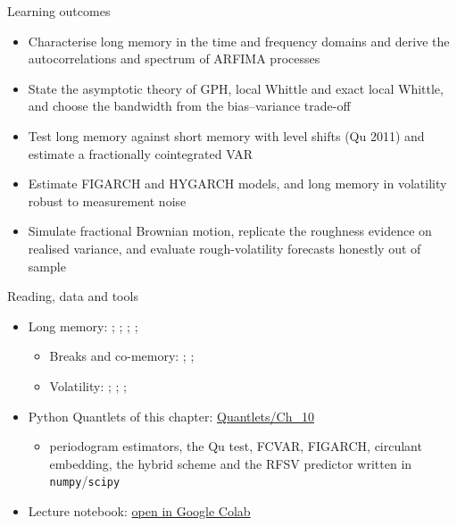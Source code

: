 \begin{frame}{Learning outcomes}
\itemsize{\small}
\begin{itemize}
    \item Characterise long memory in the time and frequency domains and derive the autocorrelations and spectrum of ARFIMA processes
    \item State the asymptotic theory of GPH, local Whittle and exact local Whittle, and choose the bandwidth from the bias--variance trade-off
    \item Test long memory against short memory with level shifts (Qu 2011) and estimate a fractionally cointegrated VAR
    \item Estimate FIGARCH and HYGARCH models, and long memory in volatility robust to measurement noise
    \item Simulate fractional Brownian motion, replicate the roughness evidence on realised variance, and evaluate rough-volatility forecasts honestly out of sample
\end{itemize}
\end{frame}

\begin{frame}{Reading, data and tools}
\itemsize{\small}
\begin{itemize}
    \item Long memory: ; ; ; ; 
    \begin{itemize}
        \item Breaks and co-memory: ; ; 
        \item Volatility: ; ; ; 
    \end{itemize}
    \item Python Quantlets of this chapter: \href{https://github.com/danpele/Advanced-Time-Series/tree/main/Quantlets/Ch_10}{Quantlets/Ch\_10}
    \begin{itemize}
        \item periodogram estimators, the Qu test, FCVAR, FIGARCH, circulant embedding, the hybrid scheme and the RFSV predictor written in \texttt{numpy}/\texttt{scipy}
    \end{itemize}
    \item Lecture notebook: \href{\colaburl{notebooks/EN/chapter10_lecture_notebook.ipynb}}{open in Google Colab}
\end{itemize}
\end{frame}

